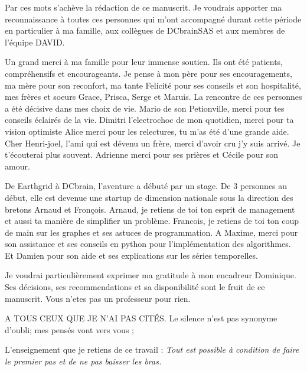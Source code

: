 

Par ces mots s'ach\`eve la r\'edaction de ce manuscrit.
Je voudrais apporter ma reconnaissance \`a toutes ces personnes qui m'ont accompagn\'e durant cette p\'eriode en particulier \`a ma famille, aux coll\`egues de DCbrainSAS et aux membres de l'\'equipe DAVID.
\newline 

Un grand merci \`a ma famille pour leur immense soutien. Ils ont \'et\'e patients, compr\'ehensifs et encourageants. Je pense \`a mon p\`ere pour ses encouragements, ma m\`ere pour son reconfort, ma tante Felicit\'e pour ses conseils et son hospitalit\'e, mes fr\`eres et soeurs Grace, Prisca, Serge et Maruis. 
\newline
La rencontre de ces personnes a \'et\'e d\'ecisive dans mes choix de vie. 
Mario de son Petionville, merci pour tes conseils \'eclair\'es de la vie.
Dimitri l'electrochoc de mon quotidien, merci pour ta vision optimiste 
Alice merci pour les relectures, tu m'as \'et\'e d'une grande aide.
Cher Henri-joel, l'ami qui est d\'evenu un fr\`ere, merci d'avoir cru j'y suis arriv\'e. Je t'\'ecouterai plus souvent.   
Adrienne merci pour ses pri\`eres et C\'ecile pour son amour.
\newline

De Earthgrid \`a DCbrain, l'aventure a d\'ebut\'e par un stage. De $3$ personnes au d\'ebut, elle est devenue une startup de dimension nationale sous la direction des bretons Arnaud et Fron\c cois. 
Arnaud, je retiens de toi ton esprit de management et aussi ta mani\`ere de simplifier un probl\`eme.
Francois, je retiens  de toi ton  coup de main sur les graphes et ses astuces de programmation.
A Maxime, merci pour son assistance et ses conseils en python pour l'impl\'ementation des algorithmes.
Et Damien pour son aide et ses explications sur les s\'eries temporelles.
\newline

Je voudrai particuli\`erement exprimer ma gratitude \`a  mon encadreur Dominique. Ses d\'ecisions, ses recommendations et sa disponibilit\'e sont le fruit de ce manuscrit. 
Vous n'etes pas un professeur pour rien.
\newline

A TOUS CEUX QUE JE N'AI PAS CIT\'ES.
Le silence n'est pas synonyme d'oubli; mes pens\'es vont vers vous ;
\newline

L'enseignement que je retiens de ce travail : \newline
{\em Tout est possible \`a condition de faire le premier pas et de ne pas baisser les bras.}
